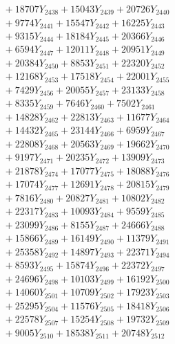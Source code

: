 \documentclass[a4paper,10pt]{article}
\begin{document}
{\begin{align}
&\;  + 18707 Y_{2438} + 15043 Y_{2439} + 20726 Y_{2440} \\[0.3ex]
&\;  + 9774 Y_{2441} + 15547 Y_{2442} + 16225 Y_{2443} \\[0.3ex]
&\;  + 9315 Y_{2444} + 18184 Y_{2445} + 20366 Y_{2446} \\[0.3ex]
&\;  + 6594 Y_{2447} + 12011 Y_{2448} + 20951 Y_{2449} \\[0.3ex]
&\;  + 20384 Y_{2450} + 8853 Y_{2451} + 22320 Y_{2452} \\[0.3ex]
&\;  + 12168 Y_{2453} + 17518 Y_{2454} + 22001 Y_{2455} \\[0.3ex]
&\;  + 7429 Y_{2456} + 20055 Y_{2457} + 23133 Y_{2458} \\[0.5ex]\allowbreak
&\;  + 8335 Y_{2459} + 7646 Y_{2460} + 7502 Y_{2461} \\[0.3ex]
&\;  + 14828 Y_{2462} + 22813 Y_{2463} + 11677 Y_{2464} \\[0.3ex]
&\;  + 14432 Y_{2465} + 23144 Y_{2466} + 6959 Y_{2467} \\[0.3ex]
&\;  + 22808 Y_{2468} + 20563 Y_{2469} + 19662 Y_{2470} \\[0.3ex]
&\;  + 9197 Y_{2471} + 20235 Y_{2472} + 13909 Y_{2473} \\[0.3ex]
&\;  + 21878 Y_{2474} + 17077 Y_{2475} + 18088 Y_{2476} \\[0.3ex]
&\;  + 17074 Y_{2477} + 12691 Y_{2478} + 20815 Y_{2479} \\[0.3ex]
&\;  + 7816 Y_{2480} + 20827 Y_{2481} + 10802 Y_{2482} \\[0.3ex]
&\;  + 22317 Y_{2483} + 10093 Y_{2484} + 9559 Y_{2485} \\[0.3ex]
&\;  + 23099 Y_{2486} + 8155 Y_{2487} + 24666 Y_{2488} \\[0.5ex]\allowbreak
&\;  + 15866 Y_{2489} + 16149 Y_{2490} + 11379 Y_{2491} \\[0.3ex]
&\;  + 25358 Y_{2492} + 14897 Y_{2493} + 22371 Y_{2494} \\[0.3ex]
&\;  + 8593 Y_{2495} + 15874 Y_{2496} + 22372 Y_{2497} \\[0.3ex]
&\;  + 24696 Y_{2498} + 10103 Y_{2499} + 16192 Y_{2500} \\[0.3ex]
&\;  + 14060 Y_{2501} + 10709 Y_{2502} + 17923 Y_{2503} \\[0.3ex]
&\;  + 25295 Y_{2504} + 11576 Y_{2505} + 18418 Y_{2506} \\[0.3ex]
&\;  + 22578 Y_{2507} + 15254 Y_{2508} + 19732 Y_{2509} \\[0.3ex]
&\;  + 9005 Y_{2510} + 18538 Y_{2511} + 20748 Y_{2512} \\[0.3ex]

\end{align}}
\end{document}
